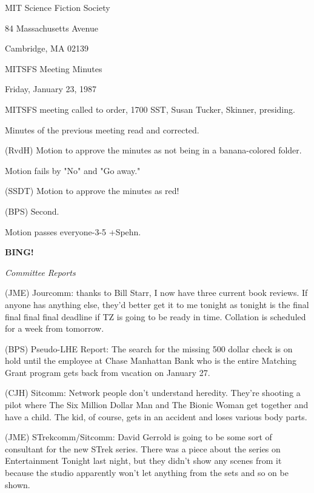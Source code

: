 \documentclass[12pt]{article}
\newcommand{\bing}{{\bf BING!} }
\newcommand{\goto}[1]{\bing \vskip 12pt \centerline{{\em{#1}}}}
\begin{document}
\begin{center}

MIT Science Fiction Society 

84 Massachusetts Avenue

Cambridge, MA 02139

\vspace{12pt}

MITSFS Meeting Minutes 

Friday, January 23, 1987

\end{center}
 
\vspace{18pt}

\setlength{\parskip}{6pt}

\noindent
MITSFS meeting called to order, 1700 SST,
Susan Tucker, Skinner, presiding.

Minutes of the previous meeting read and corrected.

(RvdH) Motion to approve the minutes as not being in a banana-colored folder.

Motion fails by "No" and "Go away."

(SSDT) Motion to approve the minutes as red!

(BPS) Second.

Motion passes everyone-3-5 +Spehn.

\goto{Committee Reports}

(JME) Jourcomm: thanks to Bill Starr, I now have three current book reviews. If anyone has anything else, they'd better get it to me tonight as tonight is the final final final final deadline if TZ is going to be ready in time. Collation is scheduled for a week from tomorrow.

(BPS) Pseudo-LHE Report: The search for the missing 500 dollar check is on hold until the employee at Chase Manhattan Bank who is the entire Matching Grant program gets back from vacation on January 27.

(CJH) Sitcomm: Network people don't understand heredity. They're shooting a pilot where The Six Million Dollar Man and The Bionic Woman get together and have a child. The kid, of course, gets in an accident and loses various body parts.

(JME) STrekcomm/Sitcomm: David Gerrold is going to be some sort of consultant for the new STrek series. There was a piece about the series on Entertainment Tonight last night, but they didn't show any scenes from it because the studio apparently won't let anything from the sets and so on be shown.
\end{document}
